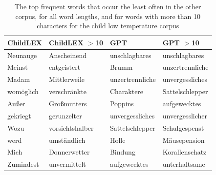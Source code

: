 \documentclass[doc, a4paper]{apa7}
\begin{document}
\begin{table}[!htbp]
\caption{The top frequent words that occur the least often in the other corpus, for all word lengths, and for words with more than 10 characters for the child low temperature corpus}

\centering
\begin{tabular}{llll}
  \hline
ChildLEX & ChildLEX $>$10 & GPT & GPT $>$10 \\ 
  \hline
Neunauge & Anscheinend & unschlagbares & unschlagbares \\ 
  Meinst & entgeistert & Brumm & unzertrennliche \\ 
  Madam & Mittlerweile & unzertrennliche & unvergessliches \\ 
  womöglich & verschränkte & Charaktere & Sattelschlepper \\ 
  Außer & Großmutters & Poppins & aufgewecktes \\ 
  gekriegt & gerunzelter & unvergessliches & unvergesslicher \\ 
  Wozu & vorsichtshalber & Sattelschlepper & Schulgespenst \\ 
  werd & umständlich & Holle & Mäusepension \\ 
  Mich & Donnerwetter & Bindung & Korallenschatz \\ 
  Zumindest & unvermittelt & aufgewecktes & unterhaltsame \\ 
   \hline
\end{tabular}
\label{words-chht-low}
\end{table}

\clearpage
\end{document}
